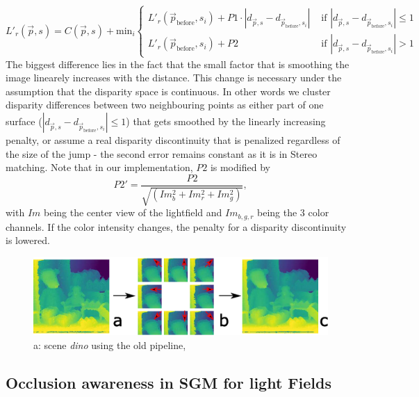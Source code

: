 \documentclass  [
  paper    = a4,
  BCOR     = 10mm,
  twoside,
  fontsize = 12pt,
  fleqn,
  toc      = bibnumbered,
  toc      = listofnumbered,
  numbers  = noendperiod,
  headings = normal,
  listof   = leveldown,
  version  = 3.03
]                                       {scrreprt}
\begin{document}
\begin{equation}\label{eq:recursive1d}
L'_r(\vec{p}, s) = C(\vec{p}, s) + \text{min}_i
\begin{cases}
L'_r(\vec{p}_\text{before}, s_i)+P1 \cdot |d_{\vec p, s} - d_{\vec{p}_\text{before}, s_i}|  & \text{ if }|d_{\vec p, s} - d_{\vec{p}_\text{before}, s_i}| \leq 1 \\
L'_r(\vec{p}_\text{before}, s_i)+P2 & \text{ if }|d_{\vec p, s} - d_{\vec{p}_\text{before}, s_i}| > 1
\end{cases}
\end{equation} 
The biggest difference lies in the fact that the small factor that is smoothing the image linearely increases with the distance. This change is necessary under the assumption that the disparity space is continuous. In other words we cluster disparity differences between two neighbouring points as either part of one surface ($|d_{\vec p, s} - d_{\vec{p}_\text{before}, s_i}| \leq 1$) that gets smoothed by the linearly increasing penalty, or assume a real disparity discontinuity that is penalized regardless of the size of the jump - the second error remains constant as it is in Stereo matching. Note that in our implementation, $P2$ is modified by 
\begin{equation}\label{eq:gradientp2}
P2' =  \frac{P2}{\sqrt{(Im_b^2 +Im_r^2 + Im_g^2)}},
\end{equation}
with $Im$ being the center view of the lightfield and $Im_{b,g,r}$ being the 3 color channels. If the color intensity changes, the penalty for a disparity discontinuity is lowered.

\begin{figure}
	\centering
	\includegraphics[width=1\linewidth]{images/subplot_sgm}
	\caption[SGM from different directions]{a: scene \textit{dino} using the old pipeline,}
	\label{fig:subplotsgm}
\end{figure}

\subsection{Occlusion awareness in SGM for light Fields}
\end{document}
